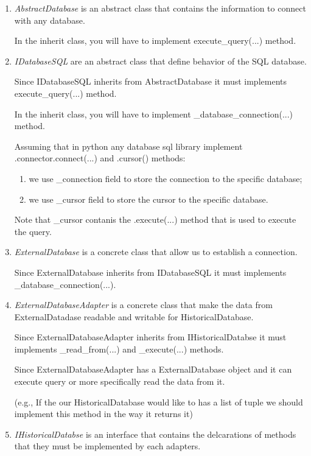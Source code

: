 \begin{enumerate}
	\item \textit{AbstractDatabase} is an abstract class that contains the information to connect with any database.
     
     In the inherit class, you will have to implement execute\_query(...) method.

	\item \textit{IDatabaseSQL} are an abstract class that define behavior of the SQL database.
     
     Since IDatabaseSQL inherits from AbstractDatabase it must implements execute\_query(...) method.
     
     In the inherit class, you will have to implement \_database\_connection(...) method.

     Assuming that in python any database sql library implement .connector.connect(...) and .cursor() methods: 
\begin{enumerate}
	\item we use \_connection field to store the connection to the specific database;
	\item we use \_cursor field to store the cursor to the specific database.
\end{enumerate}

Note that \_cursor contanis the .execute(...) method that is used to execute the query.

	\item \textit{ExternalDatabase} is a concrete class that allow us to establish a connection.
	
     Since ExternalDatabase inherits from IDatabaseSQL it must implements \_database\_connection(...).

	\item \textit{ExternalDatabaseAdapter} is a concrete class that make the data from ExternalDatadase readable and writable for HistoricalDatabase. 
	
     Since ExternalDatabaseAdapter inherits from IHistoricalDatabse it must implements \_read\_from(...) and \_execute(...) methods.
     
     Since ExternalDatabaseAdapter has a ExternalDatabase object and it can execute query or more specifically read the data from it.
     
     (e.g., If the our HistoricalDatabase would like to has a list of tuple we should implement this method in the way it returns it)

	\item \textit{IHistoricalDatabse} is an interface that contains the delcarations of methods that they must be implemented by each adapters.
	

\end{enumerate}
